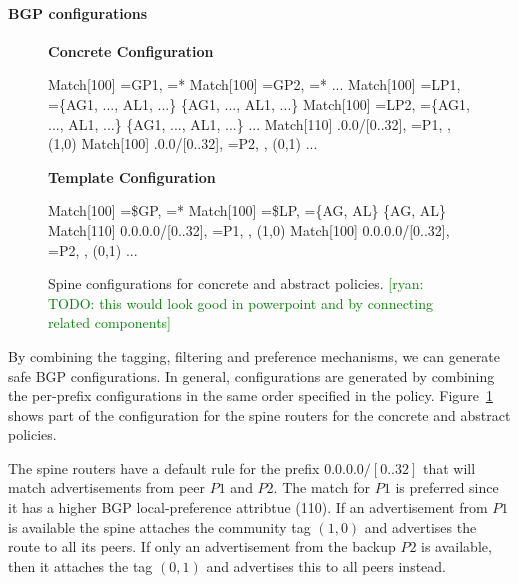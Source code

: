 \documentclass{sig-alternate-10pt}
\newcommand{\ryan}[1]{\textcolor{green}{[ryan: #1]}}
\newcommand{\para}[1]{\paragraph*{\textbf{#1}}}
\newcommand{\hdr}[2]{\flushleft \chdr{\hspace{5mm}#1}{#2}}
\newcommand{\chdr}[2]{\textbf{#1} {#2} \\ \centering}%
\begin{document}
\para{BGP configurations}

\begin{figure}[t!]
  \begin{minipage}[t]{.54\linewidth}
    \hdr{Concrete Configuration}{}
    \begin{code}
        Match[100] \PREFIX=GP1, \PEER=*
          \PEER \Arrow *
        Match[100] \PREFIX=GP2, \PEER=*
          \PEER \Arrow *
        ...
        Match[100] \PREFIX=LP1, \PEER=\{AG1, ..., AL1, ...\}
          \PEER \Arrow \{AG1, ..., AL1, ...\}
        Match[100] \PREFIX=LP2, \PEER=\{AG1, ..., AL1, ...\}
          \PEER \Arrow \{AG1, ..., AL1, ...\}
        ...
        Match[110] .0.0/[0..32], \PEER=P1,
          \PEER \Arrow *, \COMM \Arrow (1,0)
        Match[100] .0.0/[0..32], \PEER=P2,
          \PEER \Arrow *, \COMM \Arrow (0,1)
        ...
      \end{code}
  \end{minipage}
  \begin{minipage}[t]{.4\linewidth}
    \hdr{Template Configuration}{}
    \begin{code}
        Match[100] \PREFIX=\$GP, \PEER=*
          \PEER \Arrow *
        Match[100] \PREFIX=\$LP, \PEER=\{AG, AL\}
          \PEER \Arrow \{AG, AL\}
        Match[110] 0.0.0.0/[0..32], \PEER=P1,
          \PEER \Arrow *, \COMM \Arrow (1,0)
        Match[100] 0.0.0.0/[0..32], \PEER=P2,
          \PEER \Arrow *, \COMM \Arrow (0,1)
        ...
      \end{code}
  \end{minipage}%

  \hrulefill
  \vspace*{.4em}%

  \caption{Spine configurations for concrete and abstract policies. \ryan{TODO: this would look good in powerpoint and by connecting related components}}
  \label{fig:bgp-configs}
\end{figure}

By combining the tagging, filtering and preference mechanisms, we can generate safe BGP configurations. In general, configurations are generated by combining the per-prefix configurations in the same order specified in the policy. Figure~\ref{fig:bgp-configs} shows part of the configuration for the spine routers for the concrete and abstract policies.

The spine routers have a default rule for the prefix $0.0.0.0/[0..32]$ that will match advertisements from peer $P1$ and $P2$. The match for $P1$ is preferred since it has a higher BGP local-preference attribtue (110). If an advertisement from $P1$ is available the spine attaches the community tag $(1,0)$ and advertises the route to all its peers. If only an advertisement from the backup $P2$ is available, then it attaches the tag $(0,1)$ and advertises this to all peers instead.
\end{document}
